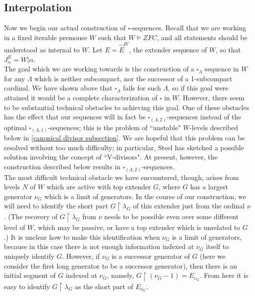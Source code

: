 \documentclass[12pt]{article}
\begin{document}
\subsection{Interpolation} \label{interpolation subsection}







Now we begin our actual construction of $\square$-sequences.  Recall that we are working in a fixed iterable premouse $W$ such that $W \models ZFC$, and all statements should be understood as internal to $W$.  Let $E = \vec{E}^W$, the extender sequence of $W$, so that $J_\alpha^E = W | \alpha$.\\


The goal which we are working towards is the construction of a $\square_\Lambda$ sequence in $W$ for any $\Lambda$ which is neither subcompact, nor the successor of a 1-subcompact cardinal. We have shown above that $\square_\Lambda$ fails for such $\Lambda$, so if this goal were attained it would be a complete characterization of $\square$ in $W$.  However, there seem to be substantial technical obstacles to achieving this goal.  One of these obstacles has the effect that our sequences will in fact be $\square_{(\Lambda , 2)}$-sequences instead of the optimal $\square_{(\Lambda , 1)}$-sequences; this is the problem of ``unstable" $W$-levels described below in \ref{canonical divisor subsection}.  We are hopeful that this problem can be resolved without too much difficulty; in particular, Steel has sketched a possible solution involving the concept of ``V-divisors".  At present, however, the construction described below results in $\square_{(\Lambda , 2)}$-sequences.\\




The most difficult technical obstacle we have encountered, though, arises from levels $N$ of $W$ which are active with top extender $G$, where $G$ has a largest generator $\nu_G$ which is a limit of generators.  In the course of our construction, we will need to identify the short part $G \restriction \lambda_G$ of this extender just from the ordinal $\nu$.  (The recovery of $G \restriction \lambda_G$ from $\nu$ needs to be possible even over some different level of $W$, which may be passive, or have a top extender which is unrelated to $G$.)  It is unclear how to make this identification when $\nu_G$ is a limit of generators, because in this case there is not enough information indexed at $\nu_G$ itself to uniquely identify $G$.  However, if $\nu_G$ is a successor generator of $G$ (here we consider the first long generator to be a successor generator), then there is an initial segment of $G$ indexed at $\nu_G$, namely, $G \restriction (\nu_G - 1) = E_{\nu_G}$.  From here it is easy to identify $G \restriction \lambda_G$ as the short part of $E_{\nu_G}$.\\
\end{document}
